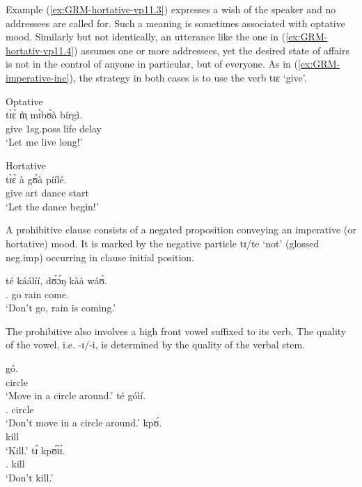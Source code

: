 Example (\ref{ex:GRM-hortative-vp11.3}) expresses a wish of the speaker and no addressees are called for. Such a meaning is sometimes associated with  optative mood. Similarly but not  identically,  an utterance like the one in (\ref{ex:GRM-hortativ-vp11.4})  assumes one or more addressees, yet the desired state of affairs is not in the control of anyone in particular, but of everyone. As in (\ref{ex:GRM-imperative-inc}), the  strategy in both cases is to use the verb {\sls tɪɛ} `give'.  

\ea\label{ex:GRM-hortative}
 
\ea\label{ex:GRM-hortative-vp11.3}{\rm Optative}\\
\gll tɪ̀ɛ̀ m̩̀ mɪ̀bʊ̀à bírgì.\\
    give {\sc 1sg.poss} life delay\\
\glt  `Let me live long!' 

\ex\label{ex:GRM-hortativ-vp11.4}{\rm Hortative}\\
\gll tɪ̀ɛ̀ à gʊ̀à píílé.\\
  give {\sc art} dance start\\
\glt  `Let the dance begin!'

\z 
 \z

A prohibitive clause consists of  a negated proposition conveying an imperative 
(or hortative) mood. It is marked by the negative particle {\sls tɪ}/{\sls te} 
`not'   (glossed {\sc neg.imp}) occurring in clause initial position.


\ea\label{GRM-neg-imp-vp15.10.}
\gll té káálíí, dʊ́ɔ́ŋ kàà wáʊ̀.\\
  {\neg.\imp} go rain {\ipfv} come.{\foc}\\
\glt  `Don't go, rain is coming.' 
\z
 
The prohibitive also involves a high front vowel  suffixed to its verb. The 
quality of the vowel, i.e. {\sls -ɪ}/{\sls -i}, is determined by the quality of 
the verbal stem.

\begin{multicols}{2}
\ea\label{ex:GRM-neg-imperative}
\ea 
\gll gó.\\
circle\\
\glt  `Move in a circle around.'
\ex 
\gll  té   góìí.\\
{\neg.\imp} circle\\
\glt  `Don't move in a circle around.'
\columnbreak
\ex  
\gll kpʊ́.\\
kill\\
\glt `Kill.'
\ex
\gll tɪ́ kpʊ́ɪ̀ɪ́.\\
{\neg.\imp} kill\\
\glt `Don't kill.'
\z 

 \z
 \end{multicols}

